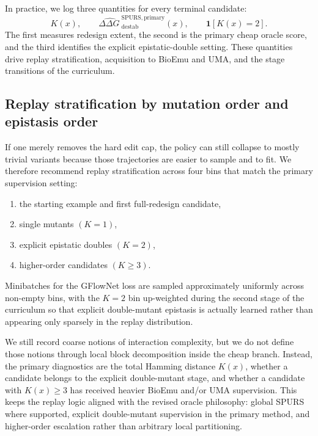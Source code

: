 \documentclass[11pt]{article}
\newcommand{\ddG}{\ensuremath{\Delta\Delta G \ }}
\begin{document}
In practice, we log three quantities for every terminal candidate:
\begin{equation}
    K(x),\qquad \widehat{\ddG}^{\mathrm{SPURS,primary}}_{\mathrm{destab}}(x),\qquad \mathbf{1}[K(x)=2].
\end{equation}
The first measures redesign extent, the second is the primary cheap oracle score, and the third identifies the explicit epistatic-double setting. These quantities drive replay stratification, acquisition to BioEmu and UMA, and the stage transitions of the curriculum.



\subsection{Replay stratification by mutation order and epistasis order}

If one merely removes the hard edit cap, the policy can still collapse to mostly trivial variants because those trajectories are easier to sample and to fit. We therefore recommend replay stratification across four bins that match the primary supervision setting:
\begin{enumerate}[leftmargin=1.5em]
    \item the starting example and first full-redesign candidate,
    \item single mutants $(K=1)$,
    \item explicit epistatic doubles $(K=2)$,
    \item higher-order candidates $(K\ge 3)$.
\end{enumerate}
Minibatches for the GFlowNet loss are sampled approximately uniformly across non-empty bins, with the $K=2$ bin up-weighted during the second stage of the curriculum so that explicit double-mutant epistasis is actually learned rather than appearing only sparsely in the replay distribution.

We still record coarse notions of interaction complexity, but we do not define those notions through local block decomposition inside the cheap branch. Instead, the primary diagnostics are the total Hamming distance $K(x)$, whether a candidate belongs to the explicit double-mutant stage, and whether a candidate with $K(x)\ge 3$ has received heavier BioEmu and/or UMA supervision. This keeps the replay logic aligned with the revised oracle philosophy: global SPURS where supported, explicit double-mutant supervision in the primary method, and higher-order escalation rather than arbitrary local partitioning.
\end{document}
